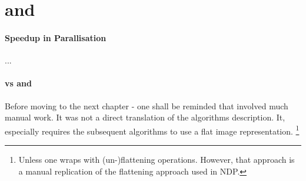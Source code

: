 \section{\pndn and \ndpv}
  
  
  
\paragraph{Speedup in Parallisation}
  ...

\paragraph{\man vs \ndpn and \ndpv}
  Before moving to the next chapter - one shall be reminded that
  \man involved much manual work. It was not a direct translation
  of the algorithms description. It, especially requires
  the subsequent algorithms to use a flat image representation.
  \footnote{Unless one wraps \man with (un-)flattening operations.
  However, that approach is a manual replication of the
  flattening approach used in NDP.}

